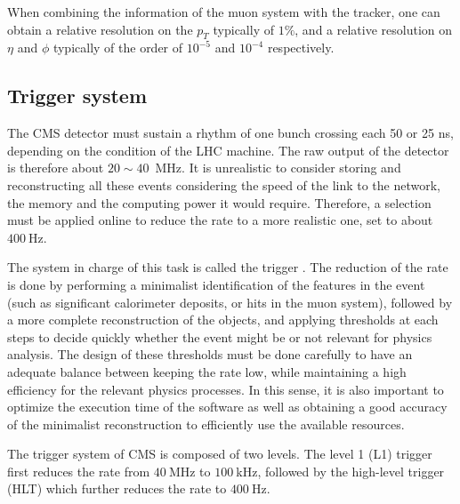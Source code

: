     When combining the information of the muon system with the tracker, one can
    obtain a relative resolution on the $p_T$ typically of $1\%$, and a relative
    resolution on $\eta$ and $\phi$ typically of the order of $10^{-5}$ and $10^{-4}$
    respectively.

    \subsection{Trigger system}

    The CMS detector must sustain a rhythm of one bunch crossing each 50 or 25 ns, depending
    on the condition of the LHC machine. The raw output of the detector is therefore
    about $20\sim40$~MHz. It is unrealistic to consider storing and reconstructing all these events
    considering the speed of the link to the network, the memory and the computing power
    it would require. Therefore, a selection must be applied online to reduce the rate
    to a more realistic one, set to about $400~$Hz.

    The system in charge of this task is called the trigger \cite{CMStrigger}. The reduction of the rate
    is done by performing a minimalist identification of the features in the event (such
    as significant calorimeter deposits, or hits in the muon system), followed by a more
    complete reconstruction of the objects, and applying thresholds at each steps to
    decide quickly whether the event might be or not relevant for physics analysis.
    The design of these thresholds must be done carefully to have an adequate balance
    between keeping the rate low, while maintaining a high efficiency for the relevant
    physics processes. In this sense, it is also important to optimize the execution
    time of the software as well as obtaining a good accuracy of the minimalist
    reconstruction to efficiently use the available resources.

    The trigger system of CMS is composed of two levels. The level 1 (L1) trigger first
    reduces the rate from $40~$MHz to $100~$kHz, followed by the high-level trigger (HLT)
    which further reduces the rate to $400~$Hz.


